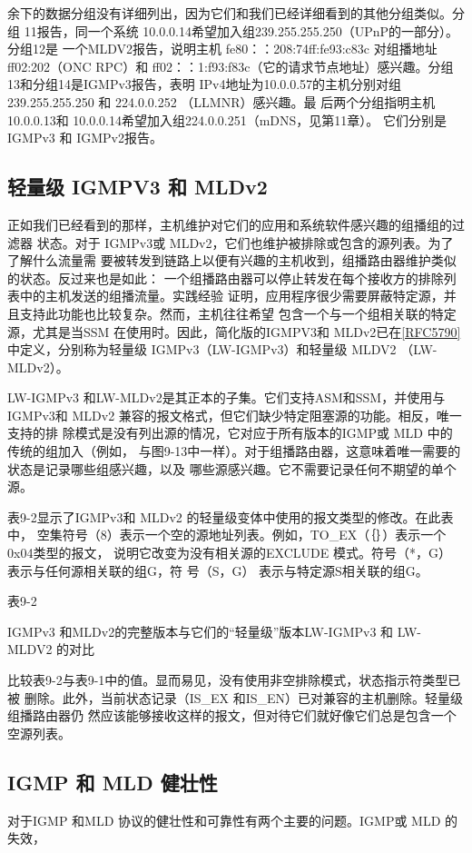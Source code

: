 余下的数据分组没有详细列出，因为它们和我们已经详细看到的其他分组类似。分组
11报告，同一个系统 10.0.0.14希望加入组239.255.255.250（UPnP的一部分）。分组12是
一个MLDV2报告，说明主机 fe80：：208:74ff:fe93:c83c 对组播地址 ff02:202（ONC RPC）和
ff02：：1:f93:f83c（它的请求节点地址）感兴趣。分组13和分组14是IGMPv3报告，表明
IPv4地址为10.0.0.57的主机分别对组239.255.255.250 和 224.0.0.252 （LLMNR）感兴趣。最
后两个分组指明主机 10.0.0.13和 10.0.0.14希望加入组224.0.0.251（mDNS，见第11章）。
它们分别是 IGMPv3 和 IGMPv2报告。

\subsection{轻量级 IGMPV3 和 MLDv2}
正如我们已经看到的那样，主机维护对它们的应用和系统软件感兴趣的组播组的过滤器
状态。对于 IGMPv3或 MLDv2，它们也维护被排除或包含的源列表。为了了解什么流量需
要被转发到链路上以便有兴趣的主机收到，组播路由器维护类似的状态。反过来也是如此：
一个组播路由器可以停止转发在每个接收方的排除列表中的主机发送的组播流量。实践经验
证明，应用程序很少需要屏蔽特定源，并且支持此功能也比较复杂。然而，主机往往希望
包含一个与一个组相关联的特定源，尤其是当SSM 在使用时。因此，简化版的IGMPV3和
MLDv2已在\href{https://www.rfc-editor.org/rfc/rfc5790}{[RFC5790]}中定义，分别称为轻量级 IGMPv3（LW-IGMPv3）和轻量级 MLDV2
（LW-MLDv2）。

LW-IGMPv3 和LW-MLDv2是其正本的子集。它们支持ASM和SSM，并使用与
IGMPv3和 MLDv2 兼容的报文格式，但它们缺少特定阻塞源的功能。相反，唯一支持的排
除模式是没有列出源的情况，它对应于所有版本的IGMP或 MLD 中的传统的组加入（例如，
与图9-13中一样）。对于组播路由器，这意味着唯一需要的状态是记录哪些组感兴趣，以及
哪些源感兴趣。它不需要记录任何不期望的单个源。

表9-2显示了IGMPv3和 MLDv2 的轻量级变体中使用的报文类型的修改。在此表中，
空集符号（8）表示一个空的源地址列表。例如，TO\_EX（｛｝）表示一个0x04类型的报文，
说明它改变为没有相关源的EXCLUDE 模式。符号（*，G） 表示与任何源相关联的组G，符
号（S，G） 表示与特定源S相关联的组G。

表9-2

IGMPv3 和MLDv2的完整版本与它们的“轻量级”版本LW-IGMPv3 和 LW-MLDV2 的对比


比较表9-2与表9-1中的值。显而易见，没有使用非空排除模式，状态指示符类型已被
删除。此外，当前状态记录（IS\_EX 和IS\_EN）已对兼容的主机删除。轻量级组播路由器仍
然应该能够接收这样的报文，但对待它们就好像它们总是包含一个空源列表。

\subsection{IGMP 和 MLD 健壮性}
对于IGMP 和MLD 协议的健壮性和可靠性有两个主要的问题。IGMP或 MLD 的失效，

